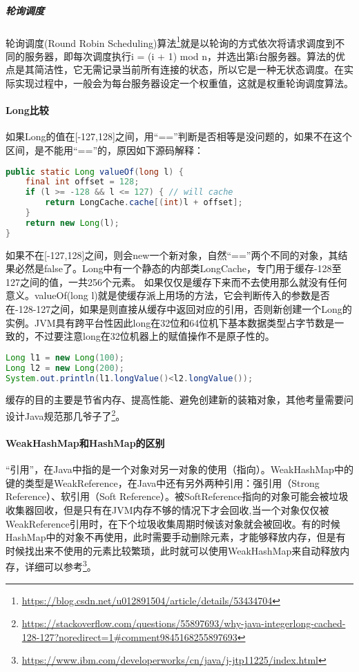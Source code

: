 \documentclass[../../../interview-questions.tex]{subfiles}
\begin{document}
\subparagraph{轮询调度}

轮询调度(Round Robin Scheduling)算法\footnote{\url{https://blog.csdn.net/u012891504/article/details/53434704}}就是以轮询的方式依次将请求调度到不同的服务器，即每次调度执行i = (i + 1) mod n，并选出第i台服务器。算法的优点是其简洁性，它无需记录当前所有连接的状态，所以它是一种无状态调度。在实际实现过程中，一般会为每台服务器设定一个权重值，这就是权重轮询调度算法。

\paragraph{Long比较}

如果Long的值在[-127,128]之间，用“==”判断是否相等是没问题的，如果不在这个区间，是不能用“==”的，原因如下源码解释：

\begin{lstlisting}[language=Java]
public static Long valueOf(long l) {
    final int offset = 128;
    if (l >= -128 && l <= 127) { // will cache
        return LongCache.cache[(int)l + offset];
    }
    return new Long(l);
}
\end{lstlisting}

如果不在[-127,128]之间，则会new一个新对象，自然“==”两个不同的对象，其结果必然是false了。Long中有一个静态的内部类LongCache，专门用于缓存-128至127之间的值，一共256个元素。
如果仅仅是缓存下来而不去使用那么就没有任何意义。valueOf(long l)就是使缓存派上用场的方法，它会判断传入的参数是否在-128-127之间，如果是则直接从缓存中返回对应的引用，否则新创建一个Long的实例。JVM具有跨平台性因此long在32位和64位机下基本数据类型占字节数是一致的，不过要注意long在32位机器上的赋值操作不是原子性的。

\begin{lstlisting}[language=Java]
Long l1 = new Long(100);
Long l2 = new Long(200);
System.out.println(l1.longValue()<l2.longValue());
\end{lstlisting}

缓存的目的主要是节省内存、提高性能、避免创建新的装箱对象，其他考量需要问设计Java规范那几爷子了\footnote{\url{https://stackoverflow.com/questions/55897693/why-java-integerlong-cached-128-127?noredirect=1\#comment9845168255897693}}。

\paragraph{WeakHashMap和HashMap的区别}

“引用”，在Java中指的是一个对象对另一对象的使用（指向）。WeakHashMap中的键的类型是WeakReference，在Java中还有另外两种引用：强引用（Strong Reference）、软引用（Soft Reference）。被SoftReference指向的对象可能会被垃圾收集器回收，但是只有在JVM内存不够的情况下才会回收,当一个对象仅仅被WeakReference引用时，在下个垃圾收集周期时候该对象就会被回收。有的时候HashMap中的对象不再使用，此时需要手动删除元素，才能够释放内存，但是有时候找出来不使用的元素比较繁琐，此时就可以使用WeakHashMap来自动释放内存，详细可以参考\footnote{\url{https://www.ibm.com/developerworks/cn/java/j-jtp11225/index.html}}。
\end{document}
